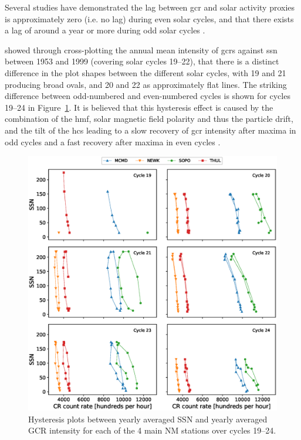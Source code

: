 Several studies have demonstrated the lag between \gls{gcr} and solar activity proxies is approximately zero (i.e. no lag) during even solar cycles, and that there exists a lag of around a year or more during odd solar cycles \citep{usoskin_correlative_1998, mavromichalaki_cosmic-ray_2007, singh_solar_2008}.

\citet{van_allen_modulation_2000} showed through cross-plotting the annual mean intensity of \glspl{gcr} against \gls{ssn} between 1953 and 1999 (covering solar cycles 19--22), that there is a distinct difference in the plot shapes between the different solar cycles, with 19 and 21 producing broad ovals, and 20 and 22 as approximately flat lines. The striking difference between odd-numbered and even-numbered cycles is shown for cycles 19--24 in Figure~\ref{fig:all_hysteresis}. It is believed that this hysteresis effect is caused by the combination of the \gls{hmf}, solar magnetic field polarity and thus the particle drift, and the tilt of the \gls{hcs} leading to a slow recovery of \gls{gcr} intensity after maxima in odd cycles and a fast recovery after maxima in even cycles  \citep{van_allen_modulation_2000, belov_large_2000, thomas_22-year_2014}.


\begin{figure}[ht!]
	\includegraphics[width=\columnwidth]{all_hysteresis.eps}
	\caption{Hysteresis plots between yearly averaged SSN and yearly averaged GCR intensity for each of the 4 main NM stations over cycles 19--24.}
	\label{fig:all_hysteresis}
\end{figure}


